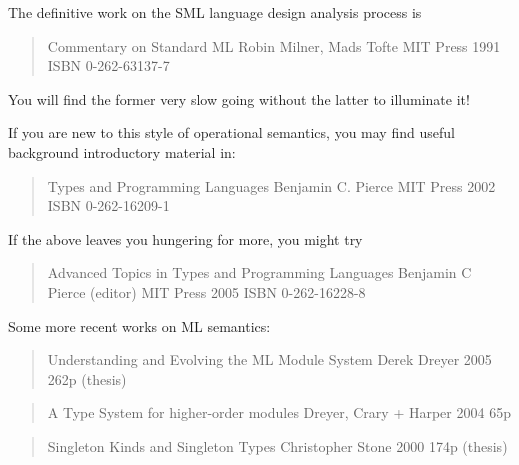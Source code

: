 The definitive work on the SML language design analysis process is\newline 
\begin{quotation}
Commentary on Standard ML\newline 
Robin Milner, Mads Tofte\newline 
MIT Press 1991 ISBN 0-262-63137-7\newline 
\end{quotation}

You will find the former very slow going without the latter to illuminate it! 

If you are new to this style of operational semantics, you may find useful 
background introductory material in: 

\begin{quotation}
Types and Programming Languages\newline 
Benjamin C. Pierce\newline 
MIT Press 2002 ISBN 0-262-16209-1\newline 
\end{quotation}

If the above leaves you hungering for more, you might try 
\begin{quotation} 
Advanced Topics in Types and Programming Languages\newline 
Benjamin C Pierce (editor)\newline 
MIT Press 2005 ISBN 0-262-16228-8\newline 
\end{quotation} 

Some more recent works on ML semantics: 
\begin{quotation} 
Understanding and Evolving the ML Module System\newline 
Derek Dreyer 2005 262p (thesis)\newline 
{}\newline 
\end{quotation} 

\begin{quotation}
A Type System for higher-order modules\newline 
Dreyer, Crary + Harper 2004 65p\newline 
{}\newline 
\end{quotation}

\begin{quotation}
Singleton Kinds and Singleton Types\newline 
Christopher Stone 2000 174p (thesis)\newline 
{}\newline 
\end{quotation}



